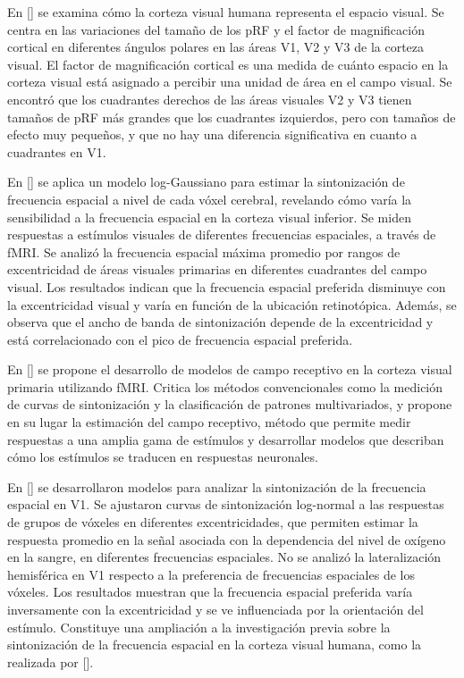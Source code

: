 En [\cite{silva_radial_2018}] se examina cómo la corteza visual humana representa el espacio visual. Se centra en las variaciones del tamaño de los pRF y el factor de magnificación cortical en diferentes ángulos polares en las áreas V1, V2 y V3 de la corteza visual. El factor de magnificaci\'on cortical es una medida de cuánto espacio en la corteza visual está asignado a percibir una unidad de área en el campo visual. Se encontr\'o que los cuadrantes derechos de las \'areas visuales V2 y V3 tienen tamaños de pRF más grandes que los cuadrantes izquierdos, pero con tamaños de efecto muy pequeños, y que no hay una diferencia significativa en cuanto a cuadrantes en V1.


En [\cite{aghajari_population_2020}] se aplica un modelo log-Gaussiano para estimar la sintonización de frecuencia espacial a nivel de cada vóxel cerebral, revelando cómo varía la sensibilidad a la frecuencia espacial en la corteza visual inferior. Se miden respuestas a estímulos visuales de diferentes frecuencias espaciales, a través de fMRI. Se analiz\'o la frecuencia espacial m\'axima promedio por rangos de excentricidad de \'areas visuales primarias en diferentes cuadrantes del campo visual. Los resultados indican que la frecuencia espacial preferida disminuye con la excentricidad visual y varía en función de la ubicación retinotópica. Además, se observa que el ancho de banda de sintonización depende de la excentricidad y está correlacionado con el pico de frecuencia espacial preferida.

En [\cite{kriegeskorte_understanding_2011}] se propone el desarrollo de modelos de campo receptivo en la corteza visual primaria utilizando fMRI. Critica los métodos convencionales como la medición de curvas de sintonización y la clasificación de patrones multivariados, y propone en su lugar la estimación del campo receptivo, método que permite medir respuestas a una amplia gama de estímulos y desarrollar modelos que describan cómo los estímulos se traducen en respuestas neuronales.

En [\cite{broderick_mapping_2022}] se desarrollaron modelos para analizar la sintonización de la frecuencia espacial en V1. Se ajustaron curvas de sintonización log-normal a las respuestas de grupos de vóxeles en diferentes excentricidades, que permiten estimar la respuesta promedio en la señal asociada con la dependencia del nivel de oxígeno en la sangre, en diferentes frecuencias espaciales. No se analiz\'o la lateralizaci\'on hemisf\'erica en V1 respecto a la preferencia de frecuencias espaciales de los v\'oxeles. Los resultados muestran que la frecuencia espacial preferida varía inversamente con la excentricidad y se ve influenciada por la orientación del estímulo. Constituye una ampliación a la investigación previa sobre la sintonización de la frecuencia espacial en la corteza visual humana, como la realizada por [\cite{aghajari_population_2020}].






